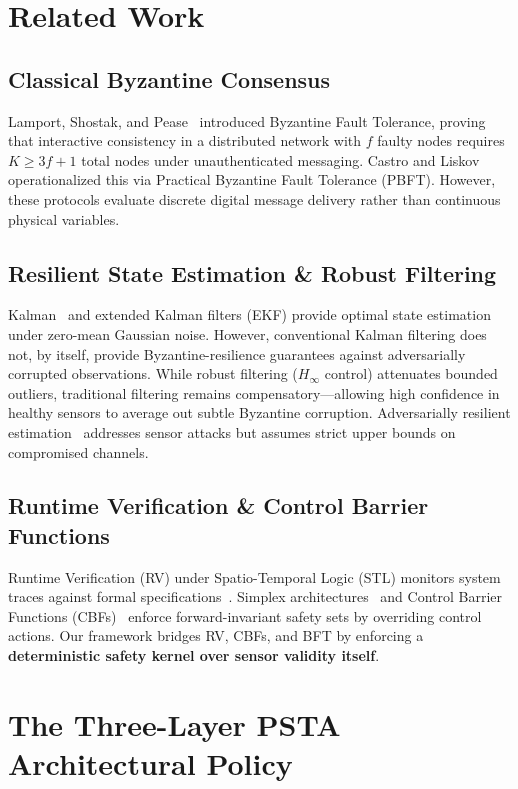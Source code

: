 \documentclass[conference]{IEEEtran}
\begin{document}
\section{Related Work}

\subsection{Classical Byzantine Consensus}
Lamport, Shostak, and Pease~\cite{lamport1982byzantine} introduced Byzantine Fault Tolerance, proving that interactive consistency in a distributed network with $f$ faulty nodes requires $K \ge 3f + 1$ total nodes under unauthenticated messaging. Castro and Liskov~\cite{castro2002pbft} operationalized this via Practical Byzantine Fault Tolerance (PBFT). However, these protocols evaluate discrete digital message delivery rather than continuous physical variables.

\subsection{Resilient State Estimation \& Robust Filtering}
Kalman~\cite{kalman1960new} and extended Kalman filters (EKF) provide optimal state estimation under zero-mean Gaussian noise. However, conventional Kalman filtering does not, by itself, provide Byzantine-resilience guarantees against adversarially corrupted observations. While robust filtering ($H_\infty$ control) attenuates bounded outliers, traditional filtering remains compensatory---allowing high confidence in healthy sensors to average out subtle Byzantine corruption. Adversarially resilient estimation~\cite{pasqualetti2013attack, fawzi2014secure} addresses sensor attacks but assumes strict upper bounds on compromised channels.

\subsection{Runtime Verification \& Control Barrier Functions}
Runtime Verification (RV) under Spatio-Temporal Logic (STL) monitors system traces against formal specifications~\cite{deshmukh2017stl}. Simplex architectures~\cite{seto1998simplex} and Control Barrier Functions (CBFs)~\cite{ames2019cbf} enforce forward-invariant safety sets by overriding control actions. Our framework bridges RV, CBFs, and BFT by enforcing a \textbf{deterministic safety kernel over sensor validity itself}.

\section{The Three-Layer PSTA Architectural Policy}
\end{document}
